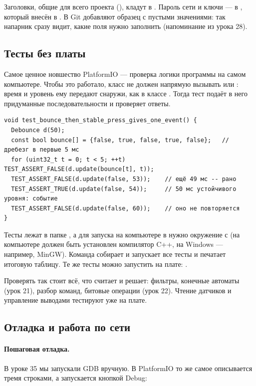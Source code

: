 Заголовки, общие для всего проекта (), кладут в .
Пароль сети и ключи --- в , который внесён в . В Git
добавляют образец  с пустыми значениями: так напарник сразу видит,
какие поля нужно заполнить (напоминание из урока 28).

\subsection{Тесты без платы}

Самое ценное новшество PlatformIO --- проверка логики программы на самом компьютере. Чтобы это
работало, класс не должен напрямую вызывать  или : время и
уровень ему передают снаружи, как в классе . Тогда тест подаёт в него
придуманные последовательности и проверяет ответы.

\begin{Verbatim}[fontsize=\small,bgcolor=codebg]
void test_bounce_then_stable_press_gives_one_event() {
  Debounce d(50);
  const bool bounce[] = {false, true, false, true, false};   // дребезг в первые 5 мс
  for (uint32_t t = 0; t < 5; ++t) TEST_ASSERT_FALSE(d.update(bounce[t], t));
  TEST_ASSERT_FALSE(d.update(false, 53));    // ещё 49 мс -- рано
  TEST_ASSERT_TRUE(d.update(false, 54));     // 50 мс устойчивого уровня: событие
  TEST_ASSERT_FALSE(d.update(false, 60));    // оно не повторяется
}
\end{Verbatim}

Тесты лежат в папке , а для запуска на компьютере в  нужно окружение
 с  (на компьютере должен быть установлен компилятор
C++, на Windows --- например, MinGW). Команда  собирает и запускает все тесты и печатает
итоговую таблицу. Те же тесты можно запустить на плате: .

Проверять так стоит всё, что считает и решает: фильтры, конечные автоматы (урок 21), разбор команд,
битовые операции (урок 22). Чтение датчиков и управление выводами тестируют уже на плате.

\subsection{Отладка и работа по сети}

\paragraph{Пошаговая отладка.} В уроке 35 мы запускали GDB вручную. В PlatformIO то же самое
описывается тремя строками, а запускается кнопкой \textsf{Debug}:

